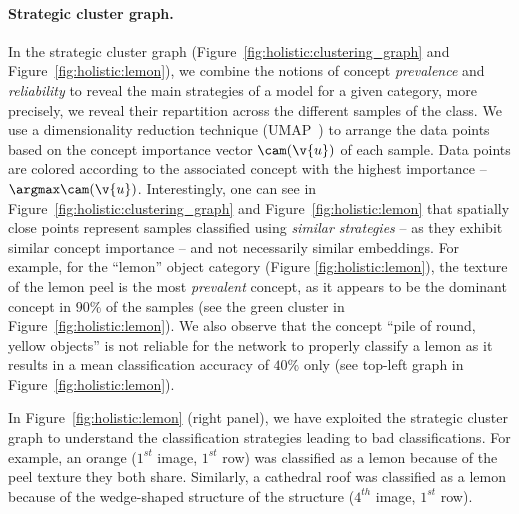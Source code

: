 \paragraph{Strategic cluster graph.} In the strategic cluster graph (Figure~\ref{fig:holistic:clustering_graph} and Figure~\ref{fig:holistic:lemon}), we combine the notions of concept \textit{prevalence} and \textit{reliability} to reveal the main strategies of a model for a given category, more precisely, we reveal their repartition across the different samples of the class.
We use a dimensionality reduction technique (UMAP~\cite{mcinnes2018umap}) to arrange the data points based on the concept importance vector $\cam(\v{u})$ of each sample. Data points are colored according to the associated concept with the highest importance -- $\argmax \cam(\v{u})$. 
Interestingly, one can see in Figure~\ref{fig:holistic:clustering_graph} and Figure~\ref{fig:holistic:lemon} that spatially close points represent samples classified using \textit{similar strategies} -- as they exhibit similar concept importance -- and not necessarily similar embeddings.
For example, for the ``lemon'' object category (Figure \ref{fig:holistic:lemon}), the texture of the lemon peel is the most \textit{prevalent} concept, as it appears to be the dominant concept in $90\%$ of the samples (see the green cluster in Figure~\ref{fig:holistic:lemon}). We also observe that the concept ``pile of round, yellow objects'' is not reliable for the network to properly classify a lemon as it results in a mean classification accuracy of $40\%$ only (see top-left graph in Figure~\ref{fig:holistic:lemon}).

In Figure~\ref{fig:holistic:lemon} (right panel), we have exploited the strategic cluster graph to understand the classification strategies leading to bad classifications. For example, an orange ($1^{st}$ image, $1^{st}$ row) was classified as a lemon because of the peel texture they both share. Similarly, a cathedral roof was classified as a lemon because of the wedge-shaped structure of the structure ($4^{th}$ image, $1^{st}$ row). 




